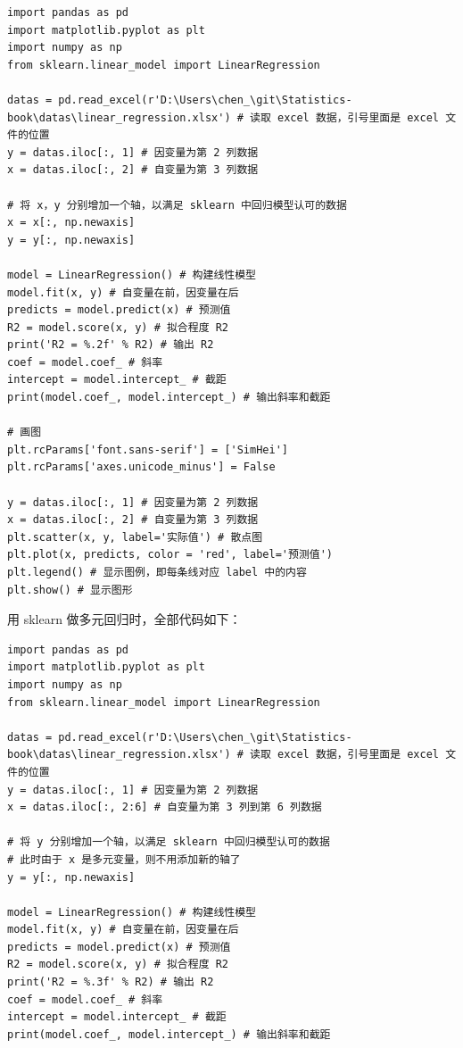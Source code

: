 \begin{lstlisting}[Language=Python]
import pandas as pd
import matplotlib.pyplot as plt
import numpy as np
from sklearn.linear_model import LinearRegression

datas = pd.read_excel(r'D:\Users\chen_\git\Statistics-book\datas\linear_regression.xlsx') # 读取 excel 数据，引号里面是 excel 文件的位置
y = datas.iloc[:, 1] # 因变量为第 2 列数据
x = datas.iloc[:, 2] # 自变量为第 3 列数据

# 将 x，y 分别增加一个轴，以满足 sklearn 中回归模型认可的数据
x = x[:, np.newaxis]
y = y[:, np.newaxis]

model = LinearRegression() # 构建线性模型
model.fit(x, y) # 自变量在前，因变量在后
predicts = model.predict(x) # 预测值
R2 = model.score(x, y) # 拟合程度 R2
print('R2 = %.2f' % R2) # 输出 R2
coef = model.coef_ # 斜率
intercept = model.intercept_ # 截距
print(model.coef_, model.intercept_) # 输出斜率和截距

# 画图
plt.rcParams['font.sans-serif'] = ['SimHei']
plt.rcParams['axes.unicode_minus'] = False

y = datas.iloc[:, 1] # 因变量为第 2 列数据
x = datas.iloc[:, 2] # 自变量为第 3 列数据
plt.scatter(x, y, label='实际值') # 散点图
plt.plot(x, predicts, color = 'red', label='预测值')
plt.legend() # 显示图例，即每条线对应 label 中的内容
plt.show() # 显示图形
\end{lstlisting}


用 sklearn 做多元回归时，全部代码如下：
\begin{lstlisting}[Language=Python]
import pandas as pd
import matplotlib.pyplot as plt
import numpy as np
from sklearn.linear_model import LinearRegression

datas = pd.read_excel(r'D:\Users\chen_\git\Statistics-book\datas\linear_regression.xlsx') # 读取 excel 数据，引号里面是 excel 文件的位置
y = datas.iloc[:, 1] # 因变量为第 2 列数据
x = datas.iloc[:, 2:6] # 自变量为第 3 列到第 6 列数据

# 将 y 分别增加一个轴，以满足 sklearn 中回归模型认可的数据
# 此时由于 x 是多元变量，则不用添加新的轴了
y = y[:, np.newaxis]

model = LinearRegression() # 构建线性模型
model.fit(x, y) # 自变量在前，因变量在后
predicts = model.predict(x) # 预测值
R2 = model.score(x, y) # 拟合程度 R2
print('R2 = %.3f' % R2) # 输出 R2
coef = model.coef_ # 斜率
intercept = model.intercept_ # 截距
print(model.coef_, model.intercept_) # 输出斜率和截距
\end{lstlisting}



